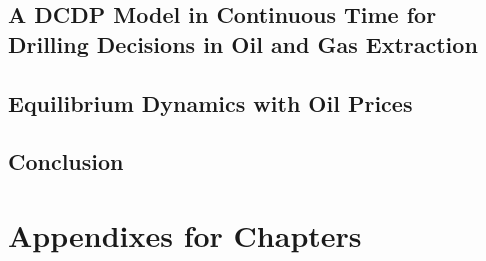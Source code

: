 \documentclass[11pt, final]{ucdavisthesis}
\begin{document}
\section{A DCDP Model in Continuous Time for Drilling Decisions in Oil and Gas Extraction}
\label{C3-Section:A-DCDP-Model-in-Continuous-Time}



\section{Equilibrium Dynamics with Oil Prices}
\label{C3-Section:Equilibrium-Dynamics-with-Oil-Prices}



\section{Conclusion}
\label{C3-Section:Conclusion}



\appendix
\chapter{Appendixes for Chapters}
\label{Chapter:Appendixes-for-Chapters}





\end{document}
